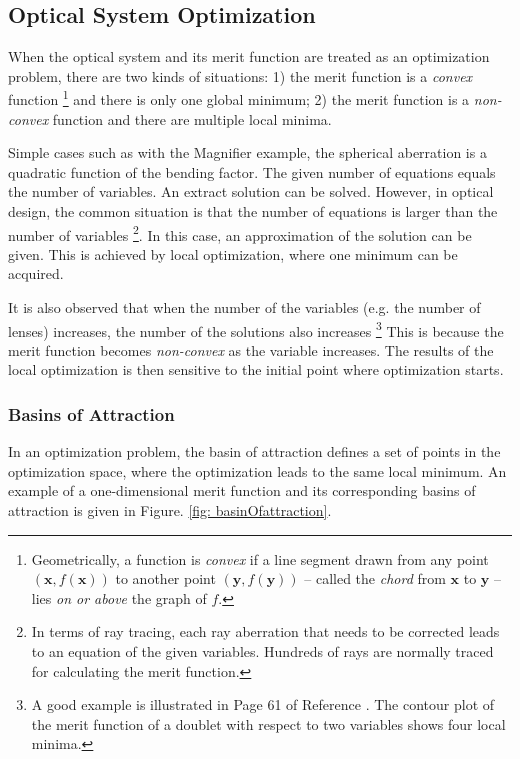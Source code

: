 \subsection{Optical System Optimization }
\vspace{1em}
When the optical system and its merit function are treated as an optimization problem, there are two kinds of situations: 1) the merit function is a \textit{convex} function \footnote{Geometrically, a function is \textit{convex} if a line segment drawn from any point $(\pmb{x}, f(\pmb{x}))$ to another point $(\pmb{y}, f(\pmb{y}))$ -- called the \textit{chord} from $\pmb{x}$ to $\pmb{y}$ -- lies \textit{on or above} the graph of $f$.} and there is only one global minimum; 2) the merit function is a \textit{non-convex} function and there are multiple local minima. 

Simple cases such as with the Magnifier example, the spherical aberration is a quadratic function of the bending factor.  The given number of equations equals the number of variables. An extract solution can be solved. However, in optical design, the common situation is that the number of equations is larger than the number of variables \footnote{In terms of ray tracing, each ray aberration that needs to be corrected leads to an equation of the given variables. Hundreds of rays are normally traced for calculating the merit function.}. In this case, an approximation of the solution can be given. This is achieved by local optimization, where one minimum can be acquired. 

It is also observed that when the number of the variables (e.g. the number of lenses) increases, the number of the solutions also increases \footnote{A good example is illustrated in Page 61 of Reference \cite{vanTurnhoutThesis2009}. The contour plot of the merit function of a doublet with respect to two variables shows four local minima.} This is because the merit function becomes \textit{non-convex} as the variable increases. The results of the local optimization is then sensitive to the initial point where optimization starts.  

\subsubsection{Basins of Attraction \label{label: basinOfattrac}}
\vspace{1em}
In an optimization problem, the basin of attraction defines a set of points in the optimization space, where the optimization leads to the same local minimum. An example of a one-dimensional merit function and its corresponding basins of attraction is given in Figure. \ref{fig: basinOfattraction}. 

